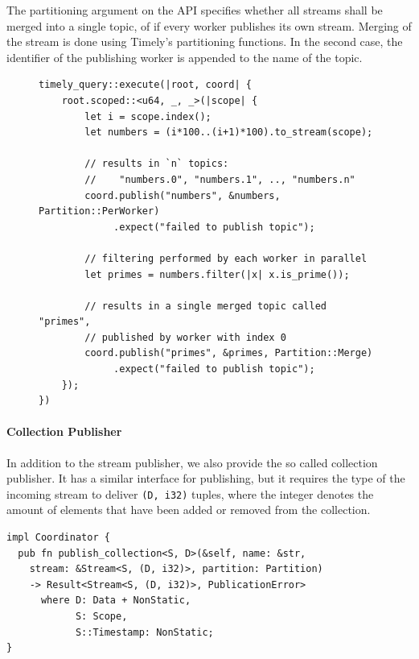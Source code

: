 The partitioning argument on the API specifies whether all streams
shall be merged into a single topic, of if every worker publishes its own stream.
Merging of the stream is done using Timely's partitioning functions. 
In the second case, the identifier of the publishing worker is appended to the
name of the topic. 

\vspace{5em}

\begin{figure}[h!]
\begin{lstlisting}[caption={
Publishing partitioned topics.
}]
timely_query::execute(|root, coord| {
    root.scoped::<u64, _, _>(|scope| {
        let i = scope.index();
        let numbers = (i*100..(i+1)*100).to_stream(scope);

        // results in `n` topics:
        //    "numbers.0", "numbers.1", .., "numbers.n"
        coord.publish("numbers", &numbers, Partition::PerWorker)
             .expect("failed to publish topic");

        // filtering performed by each worker in parallel
        let primes = numbers.filter(|x| x.is_prime());

        // results in a single merged topic called "primes",
        // published by worker with index 0
        coord.publish("primes", &primes, Partition::Merge)
             .expect("failed to publish topic");
    });
})
\end{lstlisting}
\end{figure}

\paragraph{Collection Publisher}

In addition to the stream publisher, we also provide the so called collection
publisher. It has a similar interface for publishing, but it requires the
type of the incoming stream to deliver \lstinline{(D, i32)} tuples, where
the integer denotes the amount of elements that have been added or removed from
the collection.

\begin{lstlisting}[caption={[Collection publisher interface]
}]
impl Coordinator {
  pub fn publish_collection<S, D>(&self, name: &str,
    stream: &Stream<S, (D, i32)>, partition: Partition)
    -> Result<Stream<S, (D, i32)>, PublicationError>
      where D: Data + NonStatic, 
            S: Scope,
            S::Timestamp: NonStatic;
}
\end{lstlisting}

